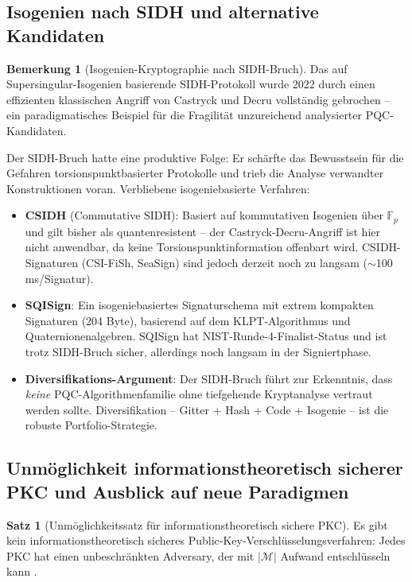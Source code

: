 ﻿\documentclass[a4paper,12pt]{article}
\theoremstyle{definition}
\newtheorem{bemerkung}{Bemerkung}[section]
\newtheorem{satz}{Satz}[section]
\begin{document}
\subsection{Isogenien nach SIDH und alternative Kandidaten}

\begin{bemerkung}[Isogenien-Kryptographie nach SIDH-Bruch]
Das auf Supersingular-Isogenien basierende SIDH-Protokoll \cite{JF11}
wurde 2022 durch einen effizienten klassischen Angriff von Castryck
und Decru \cite{CD22} vollständig gebrochen -- ein paradigmatisches
Beispiel für die Fragilität unzureichend analysierter PQC-Kandidaten.

Der SIDH-Bruch hatte eine produktive Folge: Er schärfte das
Bewusstsein für die Gefahren torsionspunktbasierter Protokolle
und trieb die Analyse verwandter Konstruktionen voran.
Verbliebene isogeniebasierte Verfahren:
\begin{itemize}
  \item \textbf{CSIDH} (Commutative SIDH): Basiert auf kommutativen
    Isogenien über $\mathbb{F}_p$ und gilt bisher als quantenresistent
    -- der Castryck-Decru-Angriff ist hier nicht anwendbar,
    da keine Torsionspunktinformation offenbart wird.
    CSIDH-Signaturen (CSI-FiSh, SeaSign) sind jedoch derzeit
    noch zu langsam ($\sim$100\,ms/Signatur).
  \item \textbf{SQISign}: Ein isogeniebasiertes Signaturschema
    mit extrem kompakten Signaturen (204 Byte), basierend auf dem
    KLPT-Algorithmus und Quaternionenalgebren. SQISign hat
    NIST-Runde-4-Finalist-Status und ist trotz SIDH-Bruch sicher,
    allerdings noch langsam in der Signiertphase.
  \item \textbf{Diversifikations-Argument}:
    Der SIDH-Bruch führt zur Erkenntnis, dass \emph{keine}
    PQC-Algorithmenfamilie ohne tiefgehende Kryptanalyse vertraut
    werden sollte. Diversifikation -- Gitter + Hash + Code + Isogenie
    -- ist die robuste Portfolio-Strategie.
\end{itemize}
\end{bemerkung}

\subsection{Unmöglichkeit informationstheoretisch sicherer PKC und Ausblick auf neue Paradigmen}

\begin{satz}[Unm\"oglichkeitssatz f\"ur informationstheoretisch sichere PKC]
Es gibt kein informationstheoretisch sicheres
Public-Key-Verschl\"usselungsverfahren: Jedes PKC hat einen
unbeschr\"ankten Adversary, der mit $|\mathcal{M}|$ Aufwand
entschl\"usseln kann \cite{Imp95}.
\end{satz}
\end{document}
